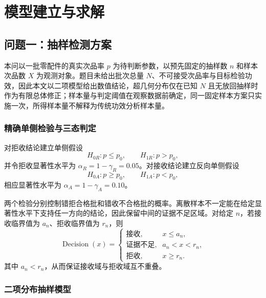 \section{模型建立与求解}

\subsection{问题一：抽样检测方案}

本问以一批零配件的真实次品率 $p$ 为待判断参数，以预先固定的抽样数 $n$ 和样本次品数 $X$ 为观测对象。题目未给出批次总量 $N$、不可接受次品率与目标检验功效，因此本文以二项模型给出数值结论，超几何分布仅在已知 $N$ 且无放回抽样时作为有限总体修正；样本量与判定阈值在观察数据前确定，同一固定样本方案只实施一次，所得样本量不解释为传统功效分析样本量。

\subsubsection{精确单侧检验与三态判定}

对拒收结论建立单侧假设
\begin{equation}
  H_{0R}:p\le p_0,\qquad H_{1R}:p>p_0,
  \label{eq:q1-reject-hypothesis}
\end{equation}
并令拒收显著性水平为 $\alpha_R=1-\gamma_R=0.05$。对接收结论建立反向单侧假设
\begin{equation}
  H_{0A}:p\ge p_0,\qquad H_{1A}:p<p_0,
  \label{eq:q1-accept-hypothesis}
\end{equation}
相应显著性水平为 $\alpha_A=1-\gamma_A=0.10$。

两个检验分别控制错拒合格批和错收不合格批的概率。离散样本不一定能在给定显著性水平下支持任一方向的结论，因此保留中间的证据不足区域。对给定 $n$，若接收临界值为 $a_n$、拒收临界值为 $r_n$，则
\begin{equation}
  \operatorname{Decision}(x)=
  \begin{cases}
    \text{接收}, & x\le a_n,\\
    \text{证据不足}, & a_n<x<r_n,\\
    \text{拒收}, & x\ge r_n.
  \end{cases}
  \label{eq:q1-three-way-decision}
\end{equation}
其中 $a_n<r_n$，从而保证接收域与拒收域互不重叠。

\subsubsection{二项分布抽样模型}


